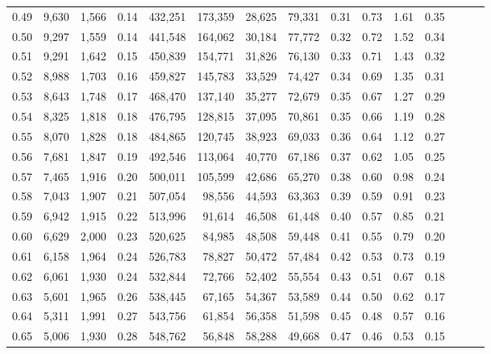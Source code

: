 \begin{tabular}{rrrrrrrrrrrrrrr}
0.49 &   9,630 &  1,566 &  0.14 &  432,251 &  173,359 &   28,625 &   79,331 &  0.31 &  0.73 &  1.61 &      0.35 \\
0.50 &   9,297 &  1,559 &  0.14 &  441,548 &  164,062 &   30,184 &   77,772 &  0.32 &  0.72 &  1.52 &      0.34 \\
0.51 &   9,291 &  1,642 &  0.15 &  450,839 &  154,771 &   31,826 &   76,130 &  0.33 &  0.71 &  1.43 &      0.32 \\
0.52 &   8,988 &  1,703 &  0.16 &  459,827 &  145,783 &   33,529 &   74,427 &  0.34 &  0.69 &  1.35 &      0.31 \\
0.53 &   8,643 &  1,748 &  0.17 &  468,470 &  137,140 &   35,277 &   72,679 &  0.35 &  0.67 &  1.27 &      0.29 \\
0.54 &   8,325 &  1,818 &  0.18 &  476,795 &  128,815 &   37,095 &   70,861 &  0.35 &  0.66 &  1.19 &      0.28 \\
0.55 &   8,070 &  1,828 &  0.18 &  484,865 &  120,745 &   38,923 &   69,033 &  0.36 &  0.64 &  1.12 &      0.27 \\
0.56 &   7,681 &  1,847 &  0.19 &  492,546 &  113,064 &   40,770 &   67,186 &  0.37 &  0.62 &  1.05 &      0.25 \\
0.57 &   7,465 &  1,916 &  0.20 &  500,011 &  105,599 &   42,686 &   65,270 &  0.38 &  0.60 &  0.98 &      0.24 \\
0.58 &   7,043 &  1,907 &  0.21 &  507,054 &   98,556 &   44,593 &   63,363 &  0.39 &  0.59 &  0.91 &      0.23 \\
0.59 &   6,942 &  1,915 &  0.22 &  513,996 &   91,614 &   46,508 &   61,448 &  0.40 &  0.57 &  0.85 &      0.21 \\
0.60 &   6,629 &  2,000 &  0.23 &  520,625 &   84,985 &   48,508 &   59,448 &  0.41 &  0.55 &  0.79 &      0.20 \\
0.61 &   6,158 &  1,964 &  0.24 &  526,783 &   78,827 &   50,472 &   57,484 &  0.42 &  0.53 &  0.73 &      0.19 \\
0.62 &   6,061 &  1,930 &  0.24 &  532,844 &   72,766 &   52,402 &   55,554 &  0.43 &  0.51 &  0.67 &      0.18 \\
0.63 &   5,601 &  1,965 &  0.26 &  538,445 &   67,165 &   54,367 &   53,589 &  0.44 &  0.50 &  0.62 &      0.17 \\
0.64 &   5,311 &  1,991 &  0.27 &  543,756 &   61,854 &   56,358 &   51,598 &  0.45 &  0.48 &  0.57 &      0.16 \\
0.65 &   5,006 &  1,930 &  0.28 &  548,762 &   56,848 &   58,288 &   49,668 &  0.47 &  0.46 &  0.53 &      0.15 \\

\end{tabular}
